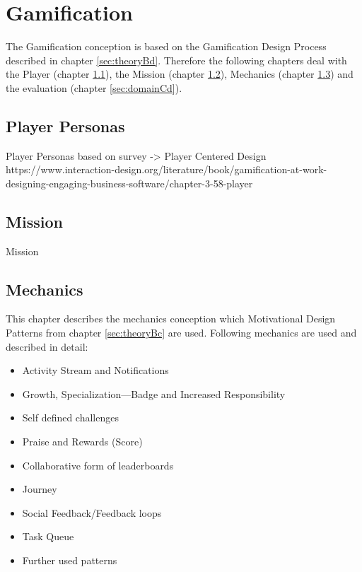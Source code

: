 
\section{Gamification}
\label{sec:domainC}


The Gamification conception is based on the Gamification Design Process described in chapter \ref{sec:theoryBd}. Therefore the following chapters deal with the Player (chapter \ref{sec:domainCa}), the Mission (chapter \ref{sec:domainCb}), Mechanics (chapter \ref{sec:domainCc}) and the evaluation (chapter \ref{sec:domainCd}).

\subsection{Player Personas}
\label{sec:domainCa}
Player Personas based on survey -> Player Centered Design
https://www.interaction-design.org/literature/book/gamification-at-work-designing-engaging-business-software/chapter-3-58-player

\subsection{Mission}
\label{sec:domainCb}
Mission

\subsection{Mechanics}
\label{sec:domainCc}

This chapter describes the mechanics conception which Motivational Design Patterns from chapter \ref{sec:theoryBc} are used.
Following mechanics are used and described in detail:
\begin{itemize}
	\item Activity Stream and Notifications
	\item Growth, Specialization—Badge and Increased Responsibility
	\item Self defined challenges
	\item Praise and Rewards (Score)
	\item Collaborative form of leaderboards
	\item Journey
	\item Social Feedback/Feedback loops
	\item Task Queue
	\item Further used patterns
\end{itemize}

